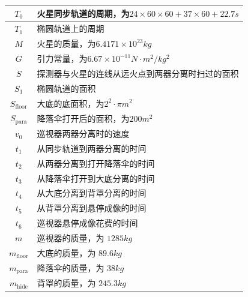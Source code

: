 \documentclass[hyperref,a4paper,UTF8]{ctexart}
\begin{document}
\begin{longtable}[h]{|c|p{10cm}|}
    \hline
    $T_0$              & 火星同步轨道的周期，为$24\times 60\times 60 + 37\times
    60 + 22.7s$                                                                 \\
    \hline
    $T_1$              & 椭圆轨道上的周期                                       \\
    \hline
    $M$                & 火星的质量，为$6.4171\times 10^{23}kg$                 \\
    \hline
    $G$                & 引力常量，为$6.67\times 10^{-11}N·m^2/kg^2$            \\
    \hline
    $S$                & 探测器与火星的连线从远火点到两器分离时扫过的面积       \\
    \hline
    $S_1$              & 椭圆轨道的面积                                         \\
    \hline
    $S_{\text{floor}}$ & 大底的底面积，为$2^2·\pi m^2$                          \\
    \hline
    $S_{\text{para}}$  & 降落伞打开后的面积，为$200m^2$                         \\
    \hline
    $v_0$              & 巡视器两器分离时的速度                                 \\
    \hline
    $t_1$              & 从同步轨道到两器分离的时间                             \\
    \hline
    $t_2$              & 从两器分离到打开降落伞的时间                           \\
    \hline
    $t_3$              & 从降落伞打开到大底分离的时间                           \\
    \hline
    $t_4$              & 从大底分离到背罩分离的时间                             \\
    \hline
    $t_5$              & 从背罩分离到悬停成像的时间                             \\
    \hline
    $t_6$              & 巡视器悬停成像花费的时间                               \\
    \hline
    $m$                & 巡视器的质量，为 $1285kg$                              \\
    \hline
    $m_{\text{floor}}$ & 大底的质量，为 $89.6kg$                                \\
    \hline
    $m_{\text{para}}$  & 降落伞的质量，为 $38kg$                                \\
    \hline
    $m_{\text{hide}}$  & 背罩的质量，为 $245.3kg$                               \\
    \hline
\end{longtable}
\end{document}
